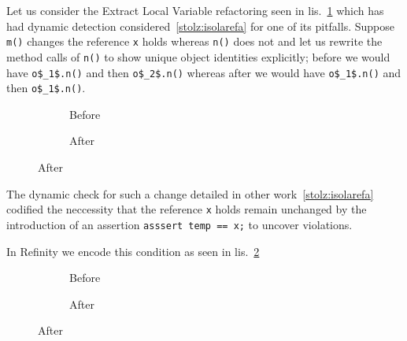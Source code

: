 Let us consider the Extract Local Variable refactoring seen in lis.~\ref{lst:ExtractVariable-java} which has had dynamic detection
considered~\ref{stolz:isolarefa} for one of its pitfalls. Suppose \lstinline[style=smallJava]|m()| changes the reference
\lstinline[style=smallJava]|x| holds whereas \lstinline[style=smallJava]|n()| does not and let us rewrite the method calls of \lstinline[style=smallJava]|n()| to show unique
object identities explicitly; before we would have \lstinline[mathescape=true,style=smallJava]|o$_1$.n()| and then
\lstinline[mathescape=true,style=smallJava]|o$_2$.n()| whereas after we would have \lstinline[mathescape=true,style=smallJava]|o$_1$.n()|
and then \lstinline[mathescape=true,style=smallJava]|o$_1$.n()|.


\begin{figure}[!htb]
  \centering
  \begin{subfigure}{.2\linewidth}
    
    \caption{Before}
  \end{subfigure}\hspace{1cm}
  \begin{subfigure}{.3\linewidth}
    
    \caption{After}
  \end{subfigure}
\label{lst:ExtractVariable-java}
\end{figure}

The dynamic check for such a change detailed in other work~\ref{stolz:isolarefa} codified the neccessity that the reference \lstinline[style=smallJava]|x|
holds remain unchanged by the introduction of an assertion \lstinline[style=smallJava]|asssert temp == x;| to uncover violations.

In Refinity we encode this condition as seen in lis.~\ref{lst:ExtractVariable-refinity}


\begin{figure}[!htb]
  \centering
  \begin{subfigure}{.4\linewidth}
    
    \caption{Before}
  \end{subfigure}\hspace{1cm}
  \begin{subfigure}{.4\linewidth}
    
    \caption{After}
  \end{subfigure}
\label{lst:ExtractVariable-refinity}
\end{figure}
